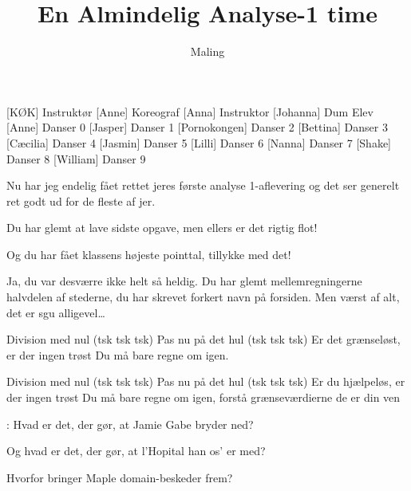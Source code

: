 \documentclass[a4paper,11pt]{article}
\title{En Almindelig Analyse-1 time}
\author{Maling}
\begin{document}
\maketitle

\begin{roles}
[KØK] Instruktør
[Anne] Koreograf
[Anna] Instruktor
[Johanna] Dum Elev
[Anne] Danser 0
[Jasper] Danser 1
[Pornokongen] Danser 2
[Bettina] Danser 3
[Cæcilia] Danser 4
[Jasmin] Danser 5
[Lilli] Danser 6
[Nanna] Danser 7
[Shake] Danser 8
[William] Danser 9
\end{roles}

\begin{song}

 Nu har jeg endelig fået rettet jeres første analyse 1-aflevering og det ser generelt ret godt ud for de fleste af jer.


 Du har glemt at lave sidste opgave, men ellers er det rigtig flot!

 Og du har fået klassens højeste pointtal, tillykke med det!


 Ja, du var desværre ikke helt så heldig. Du har glemt mellemregningerne halvdelen af stederne, du har skrevet forkert navn på forsiden. Men værst af alt, det er sgu alligevel…


 Division med nul (tsk tsk tsk) 
Pas nu på det hul (tsk tsk tsk) 
Er det grænseløst, er der ingen trøst 
Du må bare regne om igen.

 Division med nul (tsk tsk tsk) 
Pas nu på det hul (tsk tsk tsk) 
Er du hjælpeløs, er der ingen trøst 
Du må bare regne om igen, 
forstå grænseværdierne de er din ven


: Hvad er det, der gør, at Jamie Gabe bryder ned?

 Og hvad er det, der gør, at l’Hopital han os’ er med?

 Hvorfor bringer Maple domain-beskeder frem?


\end{song}
\end{document}

